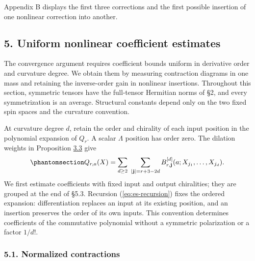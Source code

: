 \documentclass[
  english,
  11pt,
  reqno]{amsart}
\begin{document}
Appendix B displays the first three corrections and the first possible
insertion of one nonlinear correction into another.

\protect{}\label{sec:es-coefficients}

\subsection{5. Uniform nonlinear coefficient
estimates}\label{uniform-nonlinear-coefficient-estimates}

The convergence argument requires coefficient bounds uniform in
derivative order and curvature degree. We obtain them by measuring
contraction diagrams in one mass and retaining the inverse-order gain in
nonlinear insertions. Throughout this section, symmetric tensors have
the full-tensor Hermitian norms of §2, and every symmetrization is an
average. Structural constants depend only on the two fixed spin spaces
and the curvature convention.

At curvature degree \(d\), retain the order and chirality of each input
position in the polynomial expansion of \(Q_r\). A scalar \(\Lambda\)
position has order zero. The dilation weights in Proposition
\hyperref[prop:es-polynomial-derivations]{3.3} give
\begin{equation}\protect\phantomsection\label{eq:es-ordered-expansion}{
 Q_{r,a}(X)=\sum_{d\ge2}\ 
 \sum_{|\mathbf j|=r+3-2d}
 B^{[d]}_{r,\mathbf j}(a;X_{j_1},\ldots,X_{j_d}).
}\end{equation} We first estimate coefficients with fixed input and
output chiralities; they are grouped at the end of §5.3. Recursion
(\ref{eq:es-recursion}) fixes the ordered expansion: differentiation
replaces an input at its existing position, and an insertion preserves
the order of its own inputs. This convention determines coefficients of
the commutative polynomial without a symmetric polarization or a factor
\(1/d!\).

\protect{}\label{sec:es-contractions}

\subsubsection{5.1. Normalized
contractions}\label{normalized-contractions}
\end{document}
